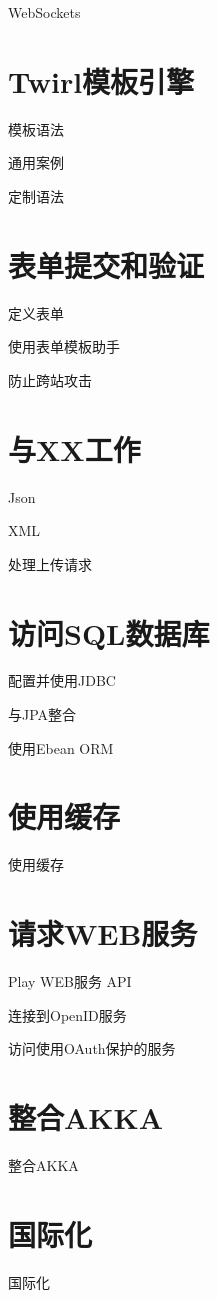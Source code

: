 \documentclass[letterpaper,10pt,english]{sphinxmanual}
\begin{document}
WebSockets


\section{Twirl模板引擎}
\label{\detokenize{index:twirl}}
模板语法

通用案例

定制语法


\section{表单提交和验证}
\label{\detokenize{index:id5}}
定义表单

使用表单模板助手

防止跨站攻击


\section{与XX工作}
\label{\detokenize{index:xx}}
Json

XML

处理上传请求


\section{访问SQL数据库}
\label{\detokenize{index:sql}}
配置并使用JDBC

与JPA整合

使用Ebean ORM


\section{使用缓存}
\label{\detokenize{index:id6}}
使用缓存


\section{请求WEB服务}
\label{\detokenize{index:web}}
Play WEB服务 API

连接到OpenID服务

访问使用OAuth保护的服务


\section{整合AKKA}
\label{\detokenize{index:akka}}
整合AKKA


\section{国际化}
\label{\detokenize{index:id7}}
国际化
\end{document}
